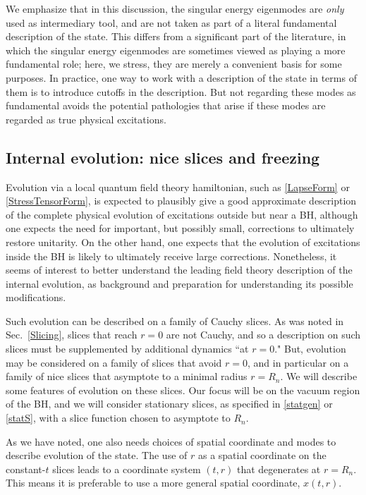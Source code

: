 \documentclass[11pt]{article}
\numberwithin{equation}{section}
\begin{document}
We emphasize that in this discussion, the singular energy eigenmodes are {\it only} used as intermediary tool, and are not taken as part of a literal fundamental description of the state.  
This differs from a significant part of the literature, in which the singular energy eigenmodes are sometimes viewed as playing a more fundamental role; here, we stress, they are merely a convenient basis for some purposes.  In practice, one way to work with a description of the state in terms of them is to introduce cutoffs in the description.  
But not  regarding these modes as fundamental  avoids the potential pathologies that arise if these modes are regarded as true physical excitations.  
 
 

\subsection{Internal evolution: nice slices and freezing}

Evolution via a local quantum field theory hamiltonian, such as \eqref{LapseForm} or \eqref{StressTensorForm}, is expected to plausibly give a good approximate description of the complete physical evolution of excitations outside but near a BH, although one expects the need for important, but possibly small,  corrections to ultimately restore unitarity\cite{SGmodels,BHQIUE,NVNL,NVU,BHQU}.  On the other hand, one expects that the evolution of excitations inside the BH is likely to ultimately receive large corrections.  Nonetheless, it seems of interest to better understand the leading field theory description of the internal evolution, as background and preparation for understanding its possible modifications.

Such evolution can be described on a family of Cauchy slices.  As was noted in Sec.~\ref{Slicing}, slices that reach $r=0$ are not Cauchy, and so a description on such slices must be supplemented by additional dynamics ``at $r=0$."  But, evolution may be considered on a family of slices that avoid $r=0$, and in particular on a family of nice slices that asymptote to a minimal radius $r=R_n$.  We will describe some features of evolution on these slices.  Our focus will be on the vacuum region of the BH, and we will consider stationary slices, as specified in \eqref{statgen} or \eqref{statS}, with a slice function chosen to asymptote to $R_n$. 

As we have noted, one also needs choices of spatial coordinate and modes to describe evolution of the state.  The use of $r$ as a spatial coordinate on the constant-$t$ slices leads to a coordinate system $(t,r)$ that degenerates at $r=R_n$.  This means it is preferable to use a more general spatial coordinate, $x(t,r)$.  
\end{document}

